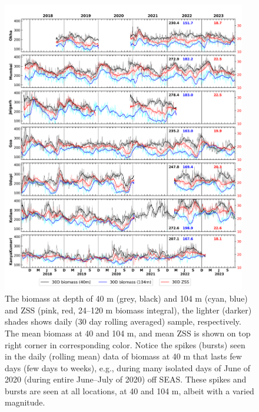 \documentclass[authoryear,review,12pt]{elsarticle}
\begin{document}
\begin{figure}[htbp]
	\centering
	\includegraphics[width=0.95\textwidth]{./figures/biomass_40m_104m.png} 
	\captionsetup{justification=justified,font=footnotesize,skip=0.05\baselineskip,width=\textwidth}
	\caption{The biomass at depth of 40 m (grey, black) and 104 m (cyan, blue) and ZSS (pink, red, 24--120 m biomass integral), the lighter (darker) shades shows daily (30 day rolling averaged) sample, respectively. The mean biomass at 40 and 104 m, and mean ZSS is shown on  top right corner in corresponding color. Notice the spikes (bursts) seen in the daily (rolling mean) data of biomass at 40 m that lasts few days (few days to weeks), e.g., during many isolated days of June of 2020 (during entire June--July of 2020) off SEAS. These spikes and bursts are seen at all locations, at 40 and 104 m, albeit with a varied magnitude.}
	\label{fig:compfourty}
\end{figure}
\end{document}
